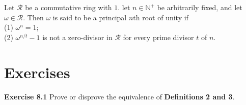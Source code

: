 \documentclass[a4paper]{article}
\begin{document}
\begin{definition}
Let $\mathcal{R}$ be a commutative ring with $1$. let $n \in \mathbb{N}^{+}$ be arbitrarily fixed, and let $\omega \in \mathcal{R}$. Then $\omega$ is said to be a principal $n$th root of unity if\\
(1) $\omega^{n} = 1$; \\
(2) $\omega^{n/t} - 1$ is not a zero-divisor in $\mathcal{R}$ for every prime divisor $t$ of $n$.
\end{definition}



\section{Exercises}
\noindent \textbf{Exercise 8.1}  Prove or disprove the equivalence of \textbf{Definitions 2 and 3}.
\end{document}
